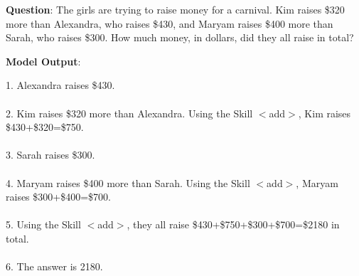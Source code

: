 \documentclass{article} %
\begin{document}
\noindent\begin{minipage}{\textwidth}
 \label{Tab:example_compose_dp_skill}
\end{minipage}


\newpage



\begin{tcolorbox}[title = {GSM8K}, colback = Apricot!25!white, colframe = BrickRed!75!black] 
\textbf{Question}:  The girls are trying to raise money for a carnival. Kim raises \$320 more than Alexandra, who raises \$430, and Maryam raises \$400 more than Sarah, who raises \$300. How much money, in dollars, did they all raise in total? 


\tcblower
\textbf{Model Output}:

\quad

1. Alexandra raises \$430. \\ \\
2. Kim raises \$320 more than Alexandra. Using the Skill $<$add$>$, Kim raises \$430+\$320=\$750. \\ \\
3. Sarah raises \$300. \\ \\
4. Maryam raises \$400 more than Sarah. Using the Skill $<$add$>$, Maryam raises \$300+\$400=\$700. \\ \\
5. Using the Skill $<$add$>$, they all raise \$430+\$750+\$300+\$700=\$2180 in total. \\ \\
6. The answer is 2180.
\end{tcolorbox}
\noindent\begin{minipage}{\textwidth}
 \label{Tab:example_compose_gsm8k_skill}
\end{minipage}



\newpage
\end{document}
